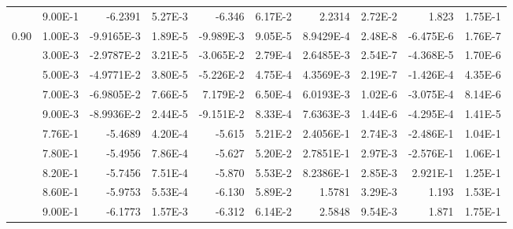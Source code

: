 \documentclass[10pt, twocolumn]{revtex4}    %
\begin{document}
\begin{table}[]
{\begin{tabular}{@{}rrrrrrrrrr@{}}
			& 9.00E-1   & -6.2391       & 5.27E-3 & -6.346            & 6.17E-2 & 2.2314        & 2.72E-2 & 1.823             & 1.75E-1 \\ \cmidrule(lr){1-10}
			\multirow{10}{*}{0.90} & 1.00E-3   & -9.9165E-3       & 1.89E-5 & -9.989E-3         & 9.05E-5 & 8.9429E-4        & 2.48E-8 & -6.475E-6         & 1.76E-7 \\
			& 3.00E-3   & -2.9787E-2       & 3.21E-5 & -3.065E-2         & 2.79E-4 & 2.6485E-3        & 2.54E-7 & -4.368E-5         & 1.70E-6 \\
			& 5.00E-3   & -4.9771E-2       & 3.80E-5 & -5.226E-2         & 4.75E-4 & 4.3569E-3        & 2.19E-7 & -1.426E-4         & 4.35E-6 \\
			& 7.00E-3   & -6.9805E-2       & 7.66E-5 & 7.179E-2          & 6.50E-4 & 6.0193E-3        & 1.02E-6 & -3.075E-4         & 8.14E-6 \\
			& 9.00E-3   & -8.9936E-2       & 2.44E-5 & -9.151E-2         & 8.33E-4 & 7.6363E-3        & 1.44E-6 & -4.295E-4         & 1.41E-5 \\
			& 7.76E-1   & -5.4689       & 4.20E-4 & -5.615            & 5.21E-2 & 2.4056E-1        & 2.74E-3 & -2.486E-1         & 1.04E-1 \\
			& 7.80E-1   & -5.4956       & 7.86E-4 & -5.627            & 5.20E-2 & 2.7851E-1        & 2.97E-3 & -2.576E-1         & 1.06E-1 \\
			& 8.20E-1   & -5.7456       & 7.51E-4 & -5.870            & 5.53E-2 & 8.2386E-1        & 2.85E-3 & 2.921E-1          & 1.25E-1 \\
			& 8.60E-1   & -5.9753       & 5.53E-4 & -6.130            & 5.89E-2 & 1.5781        & 3.29E-3 & 1.193             & 1.53E-1 \\
			& 9.00E-1   & -6.1773       & 1.57E-3 & -6.312            & 6.14E-2 & 2.5848        & 9.54E-3 & 1.871             & 1.75E-1 \\ \bottomrule
		\end{tabular}%
	}
\end{table}
\end{document}
